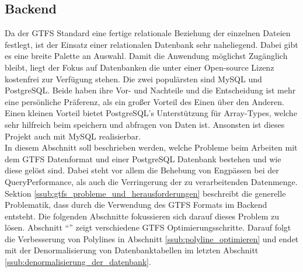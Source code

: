 \subsection{Backend}
\label{sub:backend}
  Da der GTFS Standard eine fertige relationale Beziehung der einzelnen Dateien festlegt, ist der Einsatz einer relationalen Datenbank sehr naheliegend. Dabei gibt es eine breite Palette an Auswahl. Damit die Anwendung möglichst Zugänglich bleibt, liegt der Fokus auf Datenbanken die unter einer Open-source Lizenz kostenfrei zur Verfügung stehen. Die zwei populärsten sind MySQL und PostgreSQL\parencite{db_engines}. Beide haben ihre Vor- und Nachteile und die Entscheidung ist mehr eine persönliche Präferenz, als ein großer Vorteil des Einen über den Anderen. Einen kleinen Vorteil bietet PostgreSQL's Unterstützung für Array-Types, welche sehr hilfreich beim speichern und abfragen von Daten ist. Ansonsten ist dieses Projekt auch mit MySQL realisierbar.\\

  In diesem Abschnitt soll beschrieben werden, welche Probleme beim Arbeiten mit dem GTFS Datenformat und einer PostgreSQL Datenbank bestehen und wie diese gelöst sind. Dabei steht vor allem die Behebung von Engpässen bei der Query\footnotemark Performance, als auch die Verringerung der zu verarbeitenden Datenmenge. Sektion \ref{ssub:gtfs_probleme_und_herausforderungen} beschreibt die generelle Problematik, dass durch die Verwendung des GTFS Formats im Backend entsteht. Die folgenden Abschnitte fokussieren sich darauf dieses Problem zu lösen. Abschnitt "`"' zeigt verschiedene GTFS Optimierungsschritte. Darauf folgt die Verbesserung von Polylines in Abschnitt \ref{ssub:polyline_optimieren} und endet mit der Denormalisierung von Datenbanktabellen im letzten Abschnitt \ref{ssub:denormalisierung_der_datenbank}.

  

  
  
  
  
  
  
  
  
